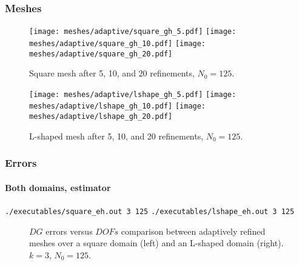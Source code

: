 \begin{frame}
    \frametitle{Meshes}

\begin{figure}[!ht]
    \centering
    \texttt{[image: meshes/adaptive/square\_gh\_5.pdf]}
    \texttt{[image: meshes/adaptive/square\_gh\_10.pdf]}
    \texttt{[image: meshes/adaptive/square\_gh\_20.pdf]}
    \caption{Square mesh after 5, 10, and 20 refinements, $N_0 = 125$.}
\end{figure}

\begin{figure}[!ht]
    \centering
    \texttt{[image: meshes/adaptive/lshape\_gh\_5.pdf]}
    \texttt{[image: meshes/adaptive/lshape\_gh\_10.pdf]}
    \texttt{[image: meshes/adaptive/lshape\_gh\_20.pdf]}
    \caption{L-shaped mesh after 5, 10, and 20 refinements, $N_0 = 125$.}
\end{figure}
\end{frame}

\begin{frame}[fragile]
    \frametitle{Errors}
    \framesubtitle{Both domains, estimator}

    \lstinline{./executables/square_eh.out 3 125}
    \lstinline{./executables/lshape_eh.out 3 125}

    \begin{figure}[!ht]
        
        \caption{$DG$ errors versus $DOFs$ comparison between adaptively refined meshes over a square domain (left) and an L-shaped domain (right). $k = 3$, $N_0 = 125$.}
    \end{figure}
\end{frame}

